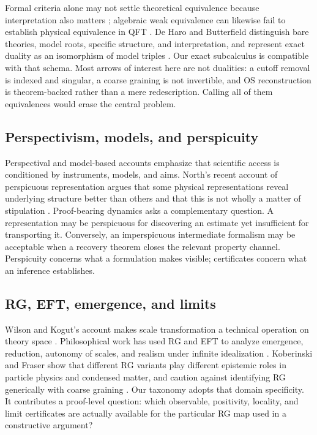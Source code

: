 Formal criteria alone may not settle theoretical equivalence because
interpretation also matters \cite{Coffey2014}; algebraic weak equivalence can
likewise fail to establish physical equivalence in QFT
\cite{Lupher2018}.  De Haro and Butterfield distinguish bare theories, model
roots, specific structure, and interpretation, and represent exact duality as
an isomorphism of model triples \cite{DeHaroButterfield2018}.  Our exact
subcalculus is compatible with that schema.  Most arrows of interest here are
not dualities: a cutoff removal is indexed and singular, a coarse graining is
not invertible, and OS reconstruction is theorem-backed rather than a mere
redescription.  Calling all of them equivalences would erase the central
problem.

\subsection{Perspectivism, models, and perspicuity}

Perspectival and model-based accounts emphasize that scientific access is
conditioned by instruments, models, and aims.  North's recent account of
perspicuous representation argues that some physical representations reveal
underlying structure better than others and that this is not wholly a matter
of stipulation \cite{North2026}.  Proof-bearing dynamics asks a complementary
question.  A representation may be perspicuous for discovering an estimate
yet insufficient for transporting it.  Conversely, an imperspicuous
intermediate formalism may be acceptable when a recovery theorem closes the
relevant property channel.  Perspicuity concerns what a formulation makes
visible; certificates concern what an inference establishes.

\subsection{RG, EFT, emergence, and limits}

Wilson and Kogut's account makes scale transformation a technical operation
on theory space \cite{WilsonKogut1974}.  Philosophical work has used RG and
EFT to analyze emergence, reduction, autonomy of scales, and realism under
infinite idealization \cite{Butterfield2011,Rivat2021}.  Koberinski and Fraser
show that different RG variants play different epistemic roles in particle
physics and condensed matter, and caution against identifying RG generically
with coarse graining \cite{KoberinskiFraser2023}.  Our taxonomy adopts that
domain specificity.  It contributes a proof-level question: which observable,
positivity, locality, and limit certificates are actually available for the
particular RG map used in a constructive argument?


